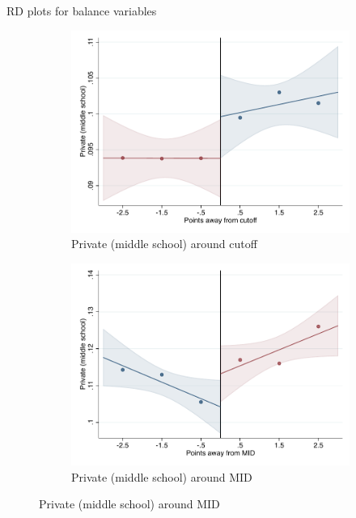 \documentclass[notes,11pt, aspectratio=169]{beamer}
\begin{document}
\begin{frame}{RD plots for balance variables}
\hyperlink{balance_rd_plot}{}
\begin{figure}

    \begin{subfigure}{0.45\textwidth}
        \centering
        \caption{Private (middle school) around cutoff}
        \includegraphics[width=\textwidth]{04_Figures/rd_plot_tau_Secundaria_Privada_IPN3.pdf}
    \end{subfigure}
    \begin{subfigure}{0.45\textwidth}
        \centering
        \caption{Private (middle school) around MID}
        \includegraphics[width=\textwidth]{04_Figures/rd_plot_mid_Secundaria_Privada_IPN3.pdf}
    \end{subfigure}
    
\end{figure}
\end{frame}
\end{document}
